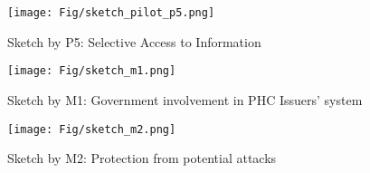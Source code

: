 \begin{figure}[!t]
 \vspace{5pt}
	\centering
	\texttt{[image: Fig/sketch\_pilot\_p5.png]}
 \vspace{-15pt}
	\caption{Sketch by P5: Selective Access to Information}
\label{fig:sketch_pilot_p5}
\vspace{-15pt}
\end{figure}

\begin{figure}[!t]
 \vspace{5pt}
	\centering
	\texttt{[image: Fig/sketch\_m1.png]}
 \vspace{-15pt}
	\caption{Sketch by M1: Government involvement in PHC Issuers’ system}
\label{fig:sketch_m1}
\vspace{-15pt}
\end{figure}

\begin{figure}[!t]
 \vspace{5pt}
	\centering
	\texttt{[image: Fig/sketch\_m2.png]}
 \vspace{-15pt}
	\caption{Sketch by M2: Protection from potential attacks}
\label{fig:sketch_m2}
\vspace{-15pt}
\end{figure}
